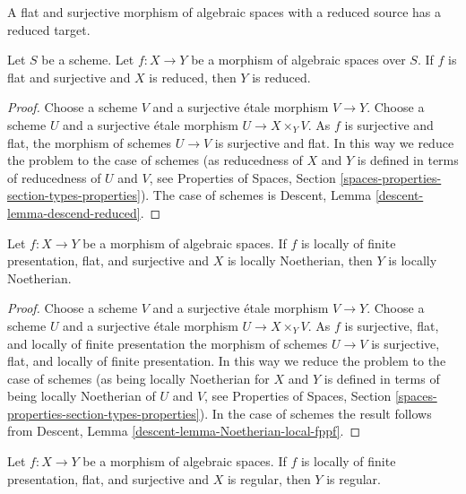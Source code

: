 \begin{lemma}
\label{lemma-descend-reduced}
\begin{slogan}
A flat and surjective morphism of algebraic spaces with a reduced source
has a reduced target.
\end{slogan}
Let $S$ be a scheme.
Let $f : X \to Y$ be a morphism of algebraic spaces over $S$.
If $f$ is flat and surjective and $X$ is reduced, then $Y$ is reduced.
\end{lemma}

\begin{proof}
Choose a scheme $V$ and a surjective \'etale morphism $V \to Y$.
Choose a scheme $U$ and a surjective \'etale morphism
$U \to X \times_Y V$. As $f$ is surjective and flat, the morphism of
schemes $U \to V$ is surjective and flat. In this way we reduce the
problem to the case of schemes (as reducedness of $X$ and $Y$ is defined
in terms of reducedness of $U$ and $V$, see
Properties of Spaces,
Section \ref{spaces-properties-section-types-properties}).
The case of schemes is
Descent, Lemma \ref{descent-lemma-descend-reduced}.
\end{proof}

\begin{lemma}
\label{lemma-descend-locally-Noetherian}
Let $f : X \to Y$ be a morphism of algebraic spaces.
If $f$ is locally of finite presentation, flat, and surjective and
$X$ is locally Noetherian, then $Y$ is locally Noetherian.
\end{lemma}

\begin{proof}
Choose a scheme $V$ and a surjective \'etale morphism $V \to Y$.
Choose a scheme $U$ and a surjective \'etale morphism
$U \to X \times_Y V$. As $f$ is surjective, flat, and locally of
finite presentation the morphism of schemes $U \to V$ is surjective, flat, and
locally of finite presentation. In this way we reduce the
problem to the case of schemes (as being locally Noetherian for $X$ and $Y$
is defined in terms of being locally Noetherian of $U$ and $V$, see
Properties of Spaces,
Section \ref{spaces-properties-section-types-properties}).
In the case of schemes the result follows from
Descent, Lemma \ref{descent-lemma-Noetherian-local-fppf}.
\end{proof}

\begin{lemma}
\label{lemma-descend-regular}
Let $f : X \to Y$ be a morphism of algebraic spaces.
If $f$ is locally of finite presentation, flat, and surjective and
$X$ is regular, then $Y$ is regular.
\end{lemma}

